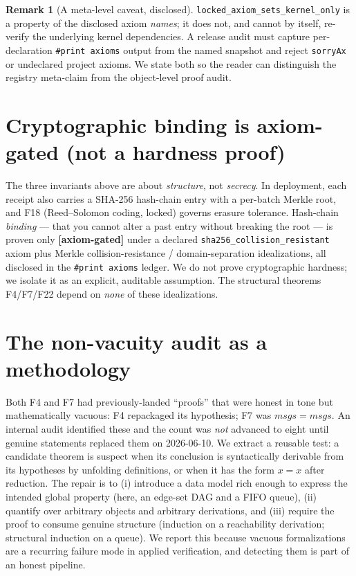 \documentclass[11pt,letterpaper]{article}
\theoremstyle{definition}
\newtheorem{remark}[theorem]{Remark}
\begin{document}
\begin{remark}[A meta-level caveat, disclosed]
\texttt{locked\_axiom\_sets\_kernel\_only} is a property of the disclosed axiom
\emph{names}; it does not, and cannot by itself, re-verify the underlying kernel
dependencies. A release audit must capture per-declaration
\texttt{\#print axioms} output from the named snapshot and reject
\texttt{sorryAx} or undeclared project axioms. We state both so the reader can
distinguish the registry meta-claim from the object-level proof audit.
\end{remark}

\section{Cryptographic binding is axiom-gated (not a hardness proof)}\label{sec:binding}

The three invariants above are about \emph{structure}, not \emph{secrecy}. In
deployment, each receipt also carries a SHA-256 hash-chain entry with a
per-batch Merkle root, and F18 (Reed--Solomon coding, locked) governs erasure
tolerance. Hash-chain \emph{binding} --- that you cannot alter a past entry
without breaking the root --- is proven only \textbf{[axiom-gated]} under a
declared \texttt{sha256\_collision\_resistant} axiom plus Merkle
collision-resistance / domain-separation idealizations, all disclosed in the
\texttt{\#print axioms} ledger. We do not prove cryptographic hardness; we
isolate it as an explicit, auditable assumption. The structural theorems F4/F7/F22
depend on \emph{none} of these idealizations.

\section{The non-vacuity audit as a methodology}\label{sec:nonvacuity}

Both F4 and F7 had previously-landed ``proofs'' that were honest in tone but
mathematically vacuous: F4 repackaged its hypothesis; F7 was $\mathit{msgs} =
\mathit{msgs}$. An internal audit identified these and the count was \emph{not}
advanced to eight until genuine statements replaced them on 2026-06-10. We
extract a reusable test: a candidate theorem is suspect when its conclusion is
syntactically derivable from its hypotheses by unfolding definitions, or when it
has the form $x = x$ after reduction. The repair is to (i) introduce a data model
rich enough to express the intended global property (here, an edge-set DAG and a
FIFO queue), (ii) quantify over arbitrary objects and arbitrary derivations, and
(iii) require the proof to consume genuine structure (induction on a reachability
derivation; structural induction on a queue). We report this because vacuous
formalizations are a recurring failure mode in applied verification, and
detecting them is part of an honest pipeline.
\end{document}
